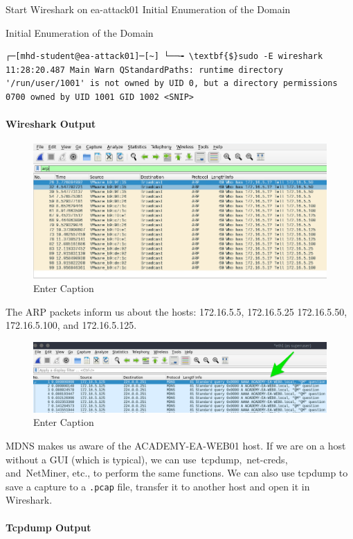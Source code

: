 Start Wireshark on ea-attack01
Initial Enumeration of the Domain

Initial Enumeration of the Domain

\begin{verbatim}
┌─[mhd-student@ea-attack01]─[~] └──╼ \textbf{$}sudo -E wireshark 11:28:20.487 Main Warn QStandardPaths: runtime directory '/run/user/1001' is not owned by UID 0, but a directory permissions 0700 owned by UID 1001 GID 1002 <SNIP> 
\end{verbatim}

\paragraph{Wireshark Output}
\begin{figure}
    \centering
    \includegraphics[width=0.75\linewidth]{ws.png}
    \caption{Enter Caption}
    \label{fig:placeholder}
\end{figure}
 

The ARP packets inform us about the hosts: 172.16.5.5, 172.16.5.25 172.16.5.50, 172.16.5.100, and 172.16.5.125.

\begin{figure}
    \centering
    \includegraphics[width=0.75\linewidth]{arpws.png}
    \caption{Enter Caption}
    \label{fig:placeholder}
\end{figure}

MDNS makes us aware of the ACADEMY-EA-WEB01 host.
If we are on a host without a GUI (which is typical), we can use tcpdump, net-creds, and NetMiner, etc., to perform the same functions. We can also use tcpdump to save a capture to a \texttt{.pcap} file, transfer it to another host and open it in Wireshark.

\paragraph{Tcpdump Output}

